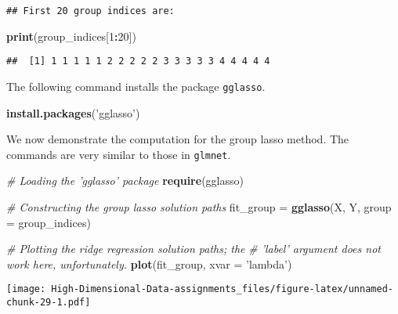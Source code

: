 \documentclass[
]{book}
\newenvironment{Shaded}{\begin{snugshade}}{\end{snugshade}}
\newcommand{\CommentTok}[1]{\textcolor[rgb]{0.56,0.35,0.01}{\textit{#1}}}
\newcommand{\DataTypeTok}[1]{\textcolor[rgb]{0.13,0.29,0.53}{#1}}
\newcommand{\DecValTok}[1]{\textcolor[rgb]{0.00,0.00,0.81}{#1}}
\newcommand{\KeywordTok}[1]{\textcolor[rgb]{0.13,0.29,0.53}{\textbf{#1}}}
\newcommand{\NormalTok}[1]{#1}
\newcommand{\OperatorTok}[1]{\textcolor[rgb]{0.81,0.36,0.00}{\textbf{#1}}}
\newcommand{\StringTok}[1]{\textcolor[rgb]{0.31,0.60,0.02}{#1}}
\begin{document}
\begin{verbatim}
## First 20 group indices are:
\end{verbatim}

\begin{Shaded}
\begin{Highlighting}[]
\KeywordTok{print}\NormalTok{(group_indices[}\DecValTok{1}\OperatorTok{:}\DecValTok{20}\NormalTok{])}
\end{Highlighting}
\end{Shaded}

\begin{verbatim}
##  [1] 1 1 1 1 1 2 2 2 2 2 3 3 3 3 3 4 4 4 4 4
\end{verbatim}

The following command installs the package \texttt{gglasso}.

\begin{Shaded}
\begin{Highlighting}[]
\KeywordTok{install.packages}\NormalTok{(}\StringTok{'gglasso'}\NormalTok{)}
\end{Highlighting}
\end{Shaded}

We now demonstrate the computation for the group lasso method. The commands are very similar to those in \texttt{glmnet}.

\begin{Shaded}
\begin{Highlighting}[]
\CommentTok{# Loading the 'gglasso' package}
\KeywordTok{require}\NormalTok{(gglasso)}

\CommentTok{# Constructing the group lasso solution paths}
\NormalTok{fit_group =}\StringTok{ }\KeywordTok{gglasso}\NormalTok{(X, Y, }\DataTypeTok{group =}\NormalTok{ group_indices)}

\CommentTok{# Plotting the ridge regression solution paths; the}
\CommentTok{# 'label' argument does not work here, unfortunately.}
\KeywordTok{plot}\NormalTok{(fit_group, }\DataTypeTok{xvar =} \StringTok{'lambda'}\NormalTok{)}
\end{Highlighting}
\end{Shaded}

\texttt{[image: High-Dimensional-Data-assignments\_files/figure-latex/unnamed-chunk-29-1.pdf]}
\end{document}
